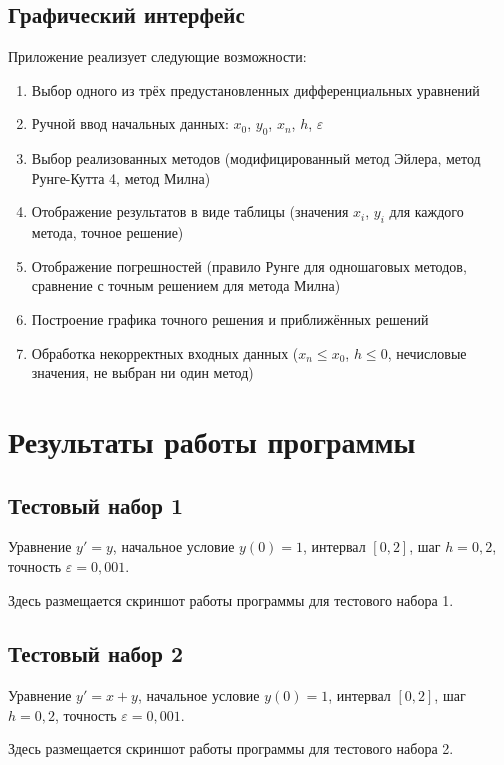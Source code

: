 \subsection{Графический интерфейс}

Приложение реализует следующие возможности:
\begin{enumerate}
\item Выбор одного из трёх предустановленных дифференциальных уравнений
\item Ручной ввод начальных данных: $x_0$, $y_0$, $x_n$, $h$, $\varepsilon$
\item Выбор реализованных методов (модифицированный метод Эйлера, метод Рунге-Кутта 4, метод Милна)
\item Отображение результатов в виде таблицы (значения $x_i$, $y_i$ для каждого метода, точное решение)
\item Отображение погрешностей (правило Рунге для одношаговых методов, сравнение с точным решением для метода Милна)
\item Построение графика точного решения и приближённых решений
\item Обработка некорректных входных данных ($x_n \leq x_0$, $h \leq 0$, нечисловые значения, не выбран ни один метод)
\end{enumerate}

\section{Результаты работы программы}

\subsection{Тестовый набор 1}

Уравнение $y' = y$, начальное условие $y(0) = 1$, интервал $[0, 2]$, шаг $h = 0{,}2$, точность $\varepsilon = 0{,}001$.

Здесь размещается скриншот работы программы для тестового набора 1.

\subsection{Тестовый набор 2}

Уравнение $y' = x + y$, начальное условие $y(0) = 1$, интервал $[0, 2]$, шаг $h = 0{,}2$, точность $\varepsilon = 0{,}001$.

Здесь размещается скриншот работы программы для тестового набора 2.

